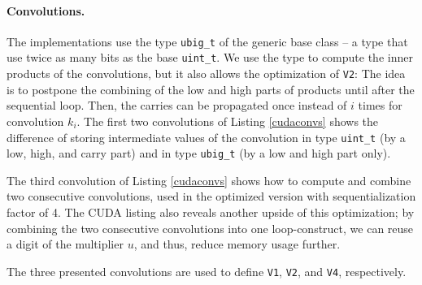 \paragraph{Convolutions.}
The implementations use the type \texttt{ubig\_t} of the generic base class -- a
type that use twice as many bits as the base \texttt{uint\_t}. We use the type
to compute the inner products of the convolutions, but it also allows the
optimization of \texttt{V2}: The idea is to postpone the combining of the low
and high parts of products until after the sequential loop. Then, the carries
can be propagated once instead of $i$ times for convolution $k_i$. The first two
convolutions of Listing \ref{cudaconvs} shows the difference of storing
intermediate values of the convolution in type \texttt{uint\_t} (by a low, high,
and carry part) and in type \texttt{ubig\_t} (by a low and high part only).

The third convolution of Listing \ref{cudaconvs} shows how to compute and
combine two consecutive convolutions, used in the optimized version with
sequentialization factor of 4. The CUDA listing also reveals another upside of
this optimization; by combining the two consecutive convolutions into one
loop-construct, we can reuse a digit of the multiplier $u$, and thus, reduce
memory usage further.

The three presented convolutions are used to define \texttt{V1}, \texttt{V2},
and \texttt{V4}, respectively.

